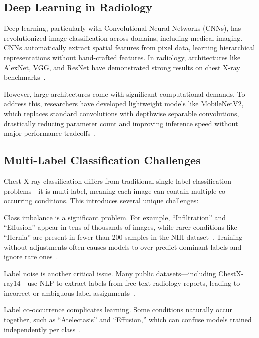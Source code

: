 \documentclass[12pt]{article}
\begin{document}
\begin{multicols}{2}
\subsection{Deep Learning in Radiology}

Deep learning, particularly with Convolutional Neural Networks (CNNs), has revolutionized image classification across domains, including medical imaging. CNNs automatically extract spatial features from pixel data, learning hierarchical representations without hand-crafted features. In radiology, architectures like AlexNet, VGG, and ResNet have demonstrated strong results on chest X-ray benchmarks~\cite{wang2017chestx, baltruschat2019comparison}.

However, large architectures come with significant computational demands. To address this, researchers have developed lightweight models like MobileNetV2, which replaces standard convolutions with depthwise separable convolutions, drastically reducing parameter count and improving inference speed without major performance tradeoffs~\cite{sandler2018mobilenetv2}.

\subsection{Multi-Label Classification Challenges}

Chest X-ray classification differs from traditional single-label classification problems—it is multi-label, meaning each image can contain multiple co-occurring conditions. This introduces several unique challenges:

Class imbalance is a significant problem. For example, “Infiltration” and “Effusion” appear in tens of thousands of images, while rarer conditions like “Hernia” are present in fewer than 200 samples in the NIH dataset~\cite{wang2017chestx}. Training without adjustments often causes models to over-predict dominant labels and ignore rare ones~\cite{baltruschat2019comparison}.

Label noise is another critical issue. Many public datasets—including ChestX-ray14—use NLP to extract labels from free-text radiology reports, leading to incorrect or ambiguous label assignments~\cite{irvin2019chexpert}.

Label co-occurrence complicates learning. Some conditions naturally occur together, such as “Atelectasis” and “Effusion,” which can confuse models trained independently per class~\cite{baltruschat2019comparison}.


\end{multicols}
\end{document}
